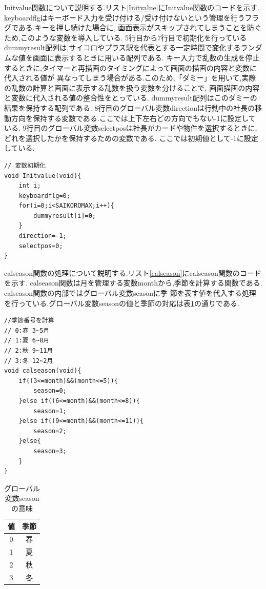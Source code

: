 \documentclass[a4j]{jarticle}
\begin{document}
    Initvalue関数について説明する.リスト\ref{Initvalue}にInitvalue関数のコードを示す.
    keyboardflgはキーボード入力を受け付ける/受け付けないという管理を行うフラグである.キーを押し続けた場合に,
    画面表示がスキップされてしまうことを防ぐため,このような変数を導入している. 5行目から7行目で初期化を行っている
    dummyresult配列は,サイコロやプラス駅を代表とする一定時間で変化するランダムな値を画面に表示するときに用いる配列である.
    キー入力で乱数の生成を停止するときに,タイマーと再描画のタイミングによって画面の描画の内容と変数に代入される値が
    異なってしまう場合がある.このため,「ダミー」を用いて,実際の乱数の計算と画面に表示する乱数を扱う変数を分けることで,
    画面描画の内容と変数に代入される値の整合性をとっている. dummyresult配列はこのダミーの結果を保持する配列である.
    8行目のグローバル変数directionは行動中の社長の移動方向を保持する変数である.ここでは上下左右どの方向でもない-1に設定している.
    9行目のグローバル変数selectposは社長がカードや物件を選択するときに,どれを選択したかを保持するための変数である.
    ここでは初期値として-1に設定している.\\

    \begin{lstlisting}[basicstyle=\ttfamily\footnotesize, frame=single,label=Initvalue,caption=Initvalue関数]
// 変数初期化
void Initvalue(void){
    int i;
    keyboardflg=0;
    for(i=0;i<SAIKOROMAX;i++){
        dummyresult[i]=0;
    }
    direction=-1;
    selectpos=0;
}
    \end{lstlisting} 

    calseason関数の処理について説明する.リスト\ref{calseason}にcalseason関数のコードを示す.
    calseason関数は月を管理する変数monthから,季節を計算する関数である. calseason関数の内部ではグローバル変数seasonに季
    節を表す値を代入する処理を行っている.グローバル変数seasonの値と季節の対応は表\ref{whoseason}の通りである.\\
    \begin{lstlisting}[basicstyle=\ttfamily\footnotesize, frame=single,label=calseason,caption=calseason関数]
//季節番号を計算
// 0:春 3~5月
// 1:夏 6~8月
// 2:秋 9~11月
// 3:冬 12~2月
void calseason(void){
    if((3<=month)&&(month<=5)){
        season=0;
    }else if((6<=month)&&(month<=8)){
        season=1;
    }else if((9<=month)&&(month<=11)){
        season=2;
    }else{
        season=3;
    }
} 
    \end{lstlisting} 

   \begin{table}[H]
    \caption{グローバル変数seasonの意味}
  \label{whoseason}
  \begin{center}
      \begin{tabular}{c|c}\hline
       値 & 季節 \\ \hline \hline
       0 & 春 \\
       1 & 夏 \\ 
       2 & 秋 \\ 
       3 & 冬 \\ \hline
      \end{tabular}
  \end{center}
  \end{table}
\end{document}
